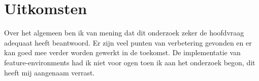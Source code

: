 \section{Uitkomsten}

Over het algemeen ben ik van mening dat dit onderzoek zeker de hoofdvraag adequaat heeft beantwoord. Er zijn veel punten van verbetering gevonden en er kan goed mee verder worden gewerkt in de toekomst. De implementatie van feature-environments had ik niet voor ogen toen ik aan het onderzoek begon, dit heeft mij aangenaam verrast.

